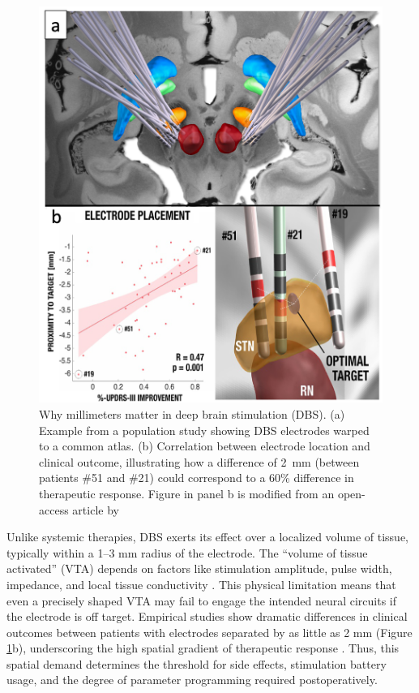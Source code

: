\begin{figure}[hbt!]
    \centering
    \includegraphics[width=1\linewidth]{figs/ch1_Figure_whymm.png}
    \caption{Why millimeters matter in deep brain stimulation (DBS). (a) Example from a population study showing DBS electrodes warped to a common atlas. (b) Correlation between electrode location and clinical outcome, illustrating how a difference of 2~mm (between patients \#51 and \#21) could correspond to a 60\% difference in therapeutic response. Figure in panel b is modified from an open-access article by \cite{Horn2018-qq}}
    \label{fig:ch1_Figure_whymm}
\end{figure}

Unlike systemic therapies, DBS exerts its effect over a localized volume of tissue, typically within a 1–3 mm radius of the electrode. The “volume of tissue activated” (VTA) depends on factors like stimulation amplitude, pulse width, impedance, and local tissue conductivity \cite{McIntyre2006-wh,Butson2007-bn}. This physical limitation means that even a precisely shaped VTA may fail to engage the intended neural circuits if the electrode is off target. Empirical studies show dramatic differences in clinical outcomes between patients with electrodes separated by as little as 2 mm (Figure \ref{fig:ch1_Figure_whymm}b), underscoring the high spatial gradient of therapeutic response \cite{Horn2018-qq, Maks2009-ci}. Thus, this spatial demand determines the threshold for side effects, stimulation battery usage, and the degree of parameter programming required postoperatively. 

